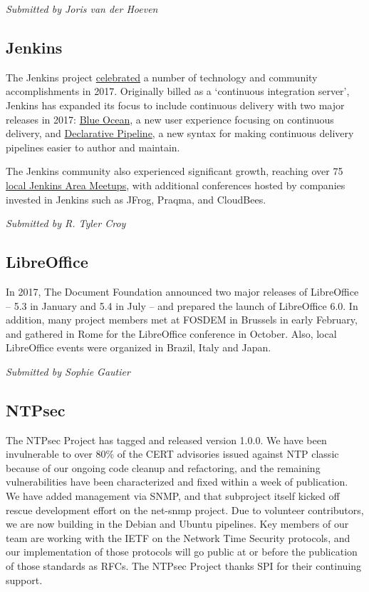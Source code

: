 \documentclass[a4paper]{report}
\begin{document}
{\em Submitted by Joris van der Hoeven}

\subsection{Jenkins}

The Jenkins project
\href{https://jenkins.io/blog/2017/12/31/new-year/}{celebrated} a number of
technology and community accomplishments in 2017. Originally billed as a
`continuous integration server', Jenkins has expanded its focus to include
continuous delivery with two major releases in 2017:
\href{https://jenkins.io/projects/blueocean}{Blue Ocean}, a new user experience
focusing on continuous delivery, and
\href{https://jenkins.io/doc/book/pipeline/syntax/#declarative-pipeline}{Declarative
Pipeline}, a new syntax for making continuous delivery pipelines easier to
author and maintain.

The Jenkins community also experienced significant growth, reaching over 75
\href{https://meetup.com/pro/jenkins}{local Jenkins Area Meetups}, with
additional conferences hosted by companies invested in Jenkins such as JFrog,
Praqma, and CloudBees.

{\em Submitted by R. Tyler Croy}

\subsection{LibreOffice}

In 2017, The Document Foundation announced two major releases of
LibreOffice -- 5.3 in January and 5.4 in July -- and prepared the launch
of LibreOffice 6.0. In addition, many project members met at FOSDEM in
Brussels in early February, and gathered in Rome for the LibreOffice
conference in October. Also, local LibreOffice events were organized in
Brazil, Italy and Japan.

{\em Submitted by Sophie Gautier}

\subsection{NTPsec}

The NTPsec Project has tagged and released version 1.0.0.  We have been
invulnerable to over 80\% of the CERT advisories issued against NTP
classic because of our ongoing code cleanup and refactoring, and the
remaining vulnerabilities have been characterized and fixed within a
week of publication.   We have added management via SNMP, and that
subproject itself kicked off rescue development effort on the net-snmp
project.  Due to volunteer contributors, we are now building in the
Debian and Ubuntu pipelines.  Key members of our team are working with
the IETF on the Network Time Security protocols, and our implementation
of those protocols will go public at or before the publication of those
standards as RFCs.  The NTPsec Project thanks SPI for their continuing
support.
\end{document}
